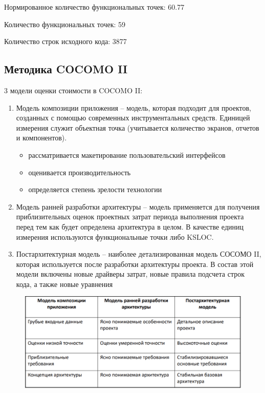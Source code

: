 Нормированное количество функциональных точек: 60.77

Количество функциональных точек: 59

Количество строк исходного кода: 3877

\subsection{Методика COCOMO II}

3 модели оценки стоимости в COCOMO II:

\begin{enumerate}
	\item Модель композиции приложения – модель, которая подходит для проектов, созданных с помощью современных инструментальных средств. Единицей измерения служит объектная точка (учитывается количество экранов, отчетов и компонентов).
	
	\begin{itemize}
		\item рассматривается макетирование пользовательский интерфейсов
		\item  оценивается производительность
		\item определяется степень зрелости технологии
	\end{itemize}
	
	\item Модель ранней разработки архитектуры – модель применяется для получения приблизительных оценок проектных затрат периода выполнения проекта перед тем как будет определена архитектура в целом. В качестве единиц измерения используются функциональные точки либо KSLOC.
	\item Постархитектурная модель – наиболее детализированная модель СОСОМО II, которая используется после разработки архитектуры проекта. В состав этой модели включены новые драйверы затрат, новые правила подсчета строк кода, а также новые уравнения
\end{enumerate}

\begin{figure}[ht!]
	\includegraphics[width=1\linewidth]{assets/images/3.1 Table.png}
	\label{fig:r2}
\end{figure}
\FloatBarrier


